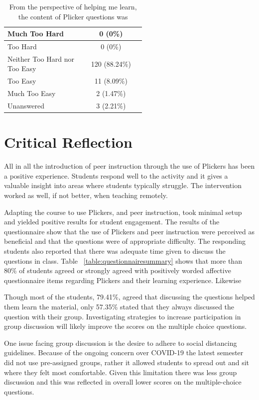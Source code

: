 \documentclass[12pt]{article}
\begin{document}
\begin{table}[ht]
\caption{From the perspective of helping me learn, the content of Plicker questions was}
\begin{tabular}{p{0.55\linewidth}|c} %
 \rowcolor{LightGray} 
 Much Too Hard & 0 (0\%)\\\midrule 
 Too Hard & 0 (0\%)\\\midrule 
 \rowcolor{LightGray}
 Neither Too Hard nor Too Easy & 120 (88.24\%)\\\midrule 
 Too Easy & 11 (8.09\%)\\\midrule 
 \rowcolor{LightGray}
 Much Too Easy & 2 (1.47\%)\\\midrule 
 Unanswered & 3 (2.21\%)\\\bottomrule 
\end{tabular}
\label{table:questionDifficulty}
\end{table}

\section{Critical Reflection}

All in all the introduction of peer instruction through the use of Plickers has been a positive experience. Students respond well to the activity and it gives a valuable insight into areas where students typically struggle. The intervention worked as well, if not better, when teaching remotely. 

Adapting the course to use Plickers, and peer instruction, took minimal setup and yielded positive results for student engagement. The results of the questionnaire show that the use of Plickers and peer instruction were perceived as beneficial and that the questions were of appropriate difficulty. The responding students also reported that there was adequate time given to discuss the questions in class. Table ~\ref{table:questionnairesummary} shows that more than 80\% of students agreed or strongly agreed with positively worded affective questionnaire items regarding Plickers and their learning experience. Likewise 

Though most of the students, 79.41\%, agreed that discussing the questions helped them learn the material, only 57.35\% stated that they always discussed the question with their group. Investigating strategies to increase participation in group discussion will likely improve the scores on the multiple choice questions.

One issue facing group discussion is the desire to adhere to social distancing guidelines. Because of the ongoing concern over COVID-19 the latest semester did not use pre-assigned groups, rather it allowed students to spread out and sit where they felt most comfortable. Given this limitation there was less group discussion and this was reflected in overall lower scores on the multiple-choice questions. 
\end{document}

